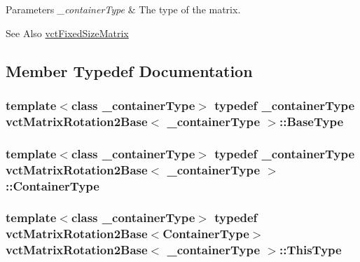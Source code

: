 \begin{DoxyParams}{Parameters}
{\em \-\_\-container\-Type} & The type of the matrix.\\
\hline
\end{DoxyParams}
\begin{DoxySeeAlso}{See Also}
\hyperlink{classvct_fixed_size_matrix}{vct\-Fixed\-Size\-Matrix} 
\end{DoxySeeAlso}


\subsection{Member Typedef Documentation}
\hypertarget{classvct_matrix_rotation2_base_a3ce93aa444c1fadbc26ed0d5582ad33a}{
\subsubsection[{Base\-Type}]{\setlength{\rightskip}{0pt plus 5cm}template$<$class \-\_\-container\-Type$>$ typedef \-\_\-container\-Type {\bf vct\-Matrix\-Rotation2\-Base}$<$ \-\_\-container\-Type $>$\-::{\bf Base\-Type}}}\label{classvct_matrix_rotation2_base_a3ce93aa444c1fadbc26ed0d5582ad33a}
\hypertarget{classvct_matrix_rotation2_base_ace2b6ba4773b1688b757cec782686180}{
\subsubsection[{Container\-Type}]{\setlength{\rightskip}{0pt plus 5cm}template$<$class \-\_\-container\-Type$>$ typedef \-\_\-container\-Type {\bf vct\-Matrix\-Rotation2\-Base}$<$ \-\_\-container\-Type $>$\-::{\bf Container\-Type}}}\label{classvct_matrix_rotation2_base_ace2b6ba4773b1688b757cec782686180}
\hypertarget{classvct_matrix_rotation2_base_a47ffeef2ddecede4b16bcc88fb432ff5}{
\subsubsection[{This\-Type}]{\setlength{\rightskip}{0pt plus 5cm}template$<$class \-\_\-container\-Type$>$ typedef {\bf vct\-Matrix\-Rotation2\-Base}$<${\bf Container\-Type}$>$ {\bf vct\-Matrix\-Rotation2\-Base}$<$ \-\_\-container\-Type $>$\-::{\bf This\-Type}}}\label{classvct_matrix_rotation2_base_a47ffeef2ddecede4b16bcc88fb432ff5}
